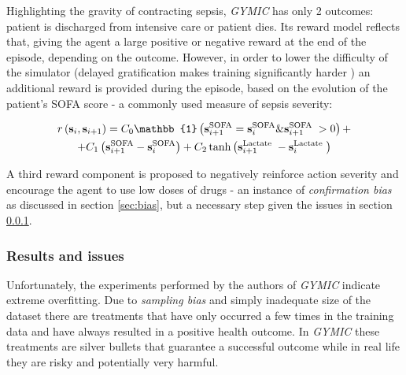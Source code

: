 Highlighting the gravity of contracting sepsis, \emph{GYMIC} has only 2 outcomes: patient is discharged from intensive care or patient dies.
Its reward model reflects that, giving the agent a large positive or negative reward at the end of the episode, depending on the outcome.
However, in order to lower the difficulty of the simulator (delayed gratification makes training significantly harder \cite{delayedgrat-humans,gulwaniProgramSynthesis2017}) an additional reward is provided during the episode, based on the evolution of the patient's SOFA score \cite{sofa} - a commonly used measure of sepsis severity:

\begin{multline}
\reward\left(\state_{\step}, \state_{\step+1}\right)=C_{0} \mathbb{1}\left(\state_{\step+1}^{\mathrm{SOFA}}=\state_{\step}^{\mathrm{SOFA}} \& \state_{\step+1}^{\text{SOFA }}>0\right) + \\ +
C_{1}\left(\state_{\step+1}^{\mathrm{SOFA}}-\state_{\step}^{\mathrm{SOFA}}\right) +
C_{2} \tanh \left(\state_{\step+1}^{\text{Lactate }}-\state_{\step}^{\text{Lactate }}\right)
\end{multline}

A third reward component is proposed to negatively reinforce action severity and encourage the agent to use low doses of drugs - an instance of \emph{confirmation bias} as discussed in section \ref{sec:bias}, but a necessary step given the issues in section \ref{sec:gymic-results}.

\subsubsection{Results and issues}
\label{sec:gymic-results}

Unfortunately, the experiments performed by the authors of \emph{GYMIC} indicate extreme overfitting.
Due to \emph{sampling bias} and simply inadequate size of the dataset there are treatments that have only occurred a few times in the training data and have always resulted in a positive health outcome.
In \emph{GYMIC} these treatments are silver bullets that guarantee a successful outcome while in real life they are risky and potentially very harmful.